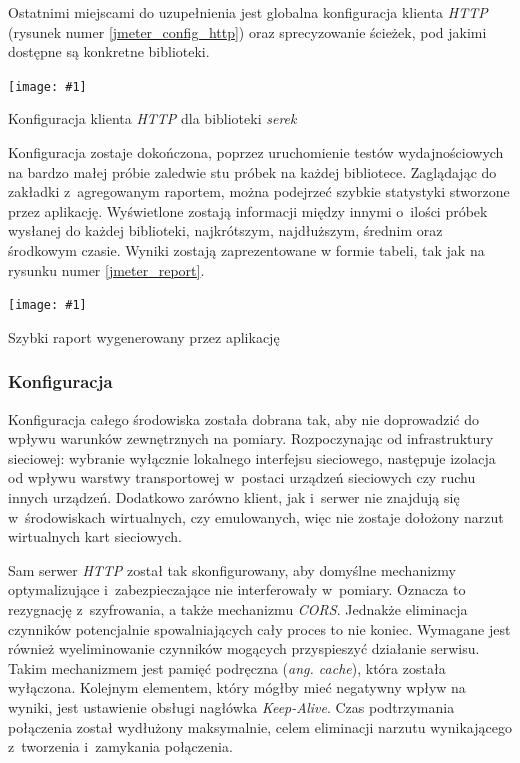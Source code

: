 \documentclass[12pt]{article}
\newcommand{\n}{\newline}
\newcommand{\putss}[3]{
\begin{captioned}[H]
	\centering
	\texttt{[image: \#1]}
	\caption{#2}
	\label{#3}
	\medskip
\end{captioned}
}
\newcommand{\nonpl}[1]{{\it #1}}
\newcommand{\code}[1]{{\it #1}}
\newcommand{\ang}[1]{\nonpl{ang. #1}}
\newcommand{\HTTP}{\nonpl{HTTP} }
\newcommand{\serek}{\nonpl{serek}}
\begin{document}
{{{				Ostatnimi miejscami do uzupełnienia jest globalna konfiguracja klienta \HTTP (rysunek numer \ref{jmeter_config_http}) oraz sprecyzowanie ścieżek, pod jakimi dostępne są konkretne biblioteki.\n

				\putss{./img/jmeter_ss/http_serek_config.png}{ Konfiguracja klienta \HTTP dla biblioteki \serek}{jmeter_config_http}

				Konfiguracja zostaje dokończona, poprzez uruchomienie testów wydajnościowych na bardzo małej próbie zaledwie stu próbek
				na każdej bibliotece. Zaglądając do zakładki z~agregowanym raportem, można podejrzeć szybkie statystyki stworzone przez aplikację. Wyświetlone
				zostają informacji między innymi o~ilości próbek wysłanej do każdej biblioteki, najkrótszym, najdłuższym, średnim oraz środkowym czasie. Wyniki
				zostają zaprezentowane w formie tabeli, tak jak na rysunku numer \ref{jmeter_report}.\n

				\putss{./img/jmeter_ss/aggregate_report.png}{ Szybki raport wygenerowany przez aplikację}{jmeter_report}
			}

			{
				\subsubsection{Konfiguracja}

				Konfiguracja całego środowiska została dobrana tak, aby nie doprowadzić do wpływu warunków zewnętrznych na pomiary. Rozpoczynając od infrastruktury sieciowej:
				wybranie wyłącznie lokalnego interfejsu sieciowego, następuje izolacja od wpływu warstwy transportowej w~postaci urządzeń sieciowych czy ruchu innych urządzeń.
				Dodatkowo zarówno klient, jak i~serwer nie znajdują się w~środowiskach wirtualnych, czy emulowanych, więc nie zostaje dołożony narzut wirtualnych kart sieciowych.\n

				Sam serwer \HTTP został tak skonfigurowany, aby domyślne mechanizmy optymalizujące i~zabezpieczające nie interferowały w~pomiary. Oznacza to rezygnację z~szyfrowania,
				a także mechanizmu \nonpl{CORS}. Jednakże eliminacja czynników potencjalnie spowalniających cały proces to nie koniec. Wymagane jest również wyeliminowanie
				czynników mogących przyspieszyć działanie serwisu. Takim mechanizmem jest pamięć podręczna (\ang{cache}), która została wyłączona. Kolejnym elementem, który mógłby mieć negatywny
				wpływ na wyniki, jest ustawienie obsługi nagłówka \code{Keep-Alive}. Czas podtrzymania połączenia został wydłużony maksymalnie, celem eliminacji narzutu wynikającego
				z~tworzenia i~zamykania połączenia.\n

}}}
\end{document}
